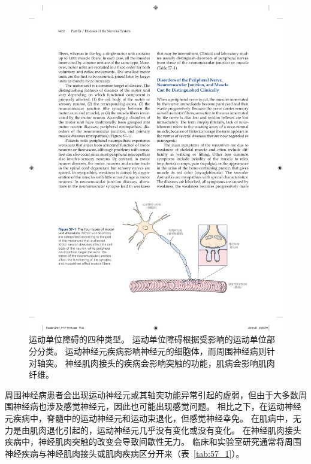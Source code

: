 \begin{figure}[htbp]
	\centering
	\includegraphics[width=0.91\linewidth]{chap57/fig_57_1}
	\caption{运动单位障碍的四种类型。
		运动单位障碍根据受影响的运动单位部分分类。
		运动神经元疾病影响神经元的细胞体，而周围神经病则针对轴突。
		神经肌肉接头的疾病会影响突触的功能，肌病会影响肌肉纤维。}
	\label{fig:57_1}
\end{figure}


周围神经病患者会出现运动神经元或其轴突功能异常引起的虚弱，但由于大多数周围神经病也涉及感觉神经元，因此也可能出现感觉问题。
相比之下，在运动神经元疾病中，脊髓中的运动神经元和运动束退化，但感觉神经幸免。
在肌病中，无力是由肌肉退化引起的，运动神经元几乎没有变化或没有变化。
在神经肌肉接头疾病中，神经肌肉突触的改变会导致间歇性无力。
临床和实验室研究通常将周围神经疾病与神经肌肉接头或肌肉疾病区分开来（表~\ref{tab:57_1}）。


